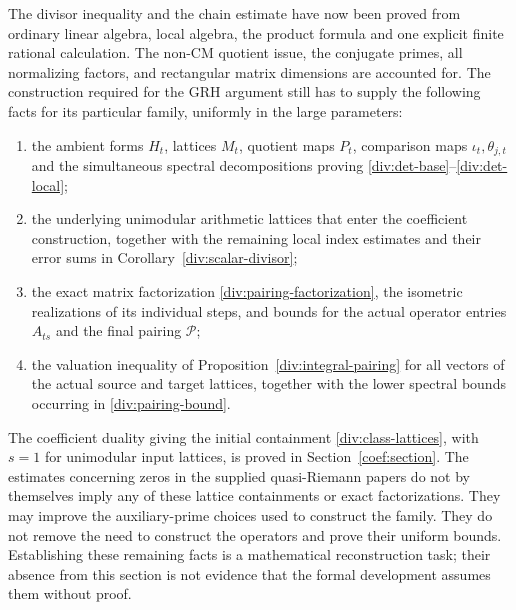 The divisor inequality and the chain estimate have now been proved from
ordinary linear algebra, local algebra, the product formula and one
explicit finite rational calculation. The non-CM quotient issue,
the conjugate primes, all normalizing factors, and rectangular matrix
dimensions are accounted for. The construction required for the GRH
argument still has to supply the following facts for its particular
family, uniformly in the large parameters:
\begin{enumerate}
\item the ambient forms $H_t$, lattices $M_t$, quotient maps $P_t$,
      comparison maps $\iota_t,\theta_{j,t}$ and the simultaneous
      spectral decompositions proving
      \eqref{div:det-base}--\eqref{div:det-local};
\item the underlying unimodular arithmetic lattices that enter the
      coefficient construction, together with the remaining local
      index estimates and their error sums in
      Corollary~\ref{div:scalar-divisor};
\item the exact matrix factorization
      \eqref{div:pairing-factorization}, the isometric realizations of
      its individual steps, and bounds for the actual operator entries
      $A_{ts}$ and the final pairing $\mathcal P$;
\item the valuation inequality of
      Proposition~\ref{div:integral-pairing} for all vectors of the
      actual source and target lattices, together with the lower
      spectral bounds occurring in \eqref{div:pairing-bound}.
\end{enumerate}
The coefficient duality giving the initial containment
\eqref{div:class-lattices}, with $s=1$ for unimodular input lattices,
is proved in Section~\ref{coef:section}. The estimates concerning zeros in the supplied quasi-Riemann papers
do not by themselves imply any of these lattice containments or exact
factorizations. They may improve the auxiliary-prime choices used to
construct the family. They do not remove the need to construct the
operators and prove their uniform bounds. Establishing these remaining
facts is a mathematical reconstruction task; their absence from this
section is not evidence that the formal development assumes them
without proof.


